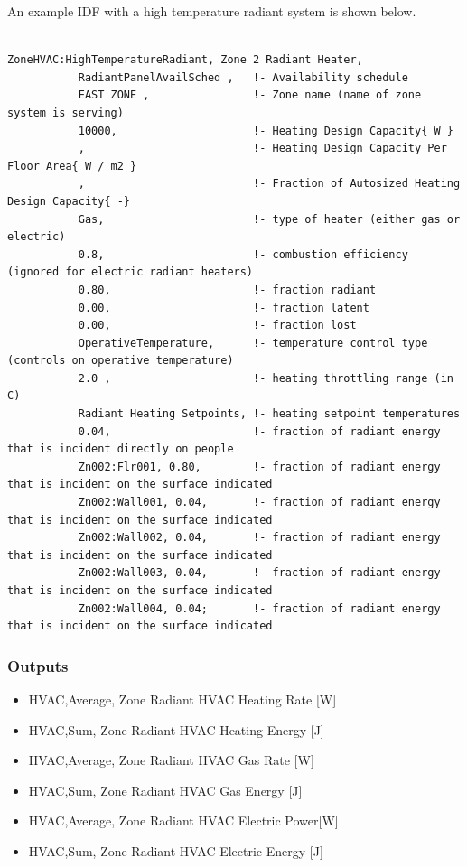An example IDF with a high temperature radiant system is shown below.

\begin{lstlisting}

ZoneHVAC:HighTemperatureRadiant, Zone 2 Radiant Heater,
           RadiantPanelAvailSched ,   !- Availability schedule
           EAST ZONE ,                !- Zone name (name of zone system is serving)
           10000,                     !- Heating Design Capacity{ W }
           ,                          !- Heating Design Capacity Per Floor Area{ W / m2 }
           ,                          !- Fraction of Autosized Heating Design Capacity{ -}
           Gas,                       !- type of heater (either gas or electric)
           0.8,                       !- combustion efficiency (ignored for electric radiant heaters)
           0.80,                      !- fraction radiant
           0.00,                      !- fraction latent
           0.00,                      !- fraction lost
           OperativeTemperature,      !- temperature control type (controls on operative temperature)
           2.0 ,                      !- heating throttling range (in C)
           Radiant Heating Setpoints, !- heating setpoint temperatures
           0.04,                      !- fraction of radiant energy that is incident directly on people
           Zn002:Flr001, 0.80,        !- fraction of radiant energy that is incident on the surface indicated
           Zn002:Wall001, 0.04,       !- fraction of radiant energy that is incident on the surface indicated
           Zn002:Wall002, 0.04,       !- fraction of radiant energy that is incident on the surface indicated
           Zn002:Wall003, 0.04,       !- fraction of radiant energy that is incident on the surface indicated
           Zn002:Wall004, 0.04;       !- fraction of radiant energy that is incident on the surface indicated
\end{lstlisting}

\subsubsection{Outputs}\label{outputs-8-006}

\begin{itemize}
\item
  HVAC,Average, Zone Radiant HVAC Heating Rate {[}W{]}
\item
  HVAC,Sum, Zone Radiant HVAC Heating Energy {[}J{]}
\item
  HVAC,Average, Zone Radiant HVAC Gas Rate {[}W{]}
\item
  HVAC,Sum, Zone Radiant HVAC Gas Energy {[}J{]}
\item
  HVAC,Average, Zone Radiant HVAC Electric Power{[}W{]}
\item
  HVAC,Sum, Zone Radiant HVAC Electric Energy {[}J{]}
\end{itemize}

